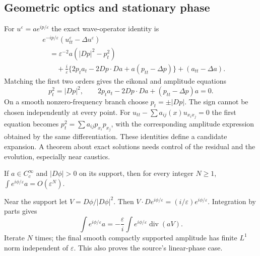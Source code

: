 \Needspace{35mm}
\subsection{Geometric optics and stationary phase}\label{sec:4-stationary}
For $u^\varepsilon=a e^{ip/\varepsilon}$ the exact wave-operator identity is
\[
 \begin{aligned}
 &e^{-ip/\varepsilon}(u^\varepsilon_{tt}-\Delta u^\varepsilon)\\
 &\quad=\varepsilon^{-2}a(|Dp|^2-p_t^2)\\
 &\qquad+\frac{i}{\varepsilon}
       \{2p_ta_t-2Dp\cdot Da+a(p_{tt}-\Delta p)\}
       +(a_{tt}-\Delta a).
 \end{aligned}
\]
Matching the first two orders gives the eikonal and amplitude equations
\[
 p_t^2=|Dp|^2,\qquad
 2p_ta_t-2Dp\cdot Da+(p_{tt}-\Delta p)a=0 .
\]
On a smooth nonzero-frequency branch choose $p_t=\pm|Dp|$.
The sign cannot be chosen independently at every point.
For $u_{tt}-\sum a_{ij}(x)u_{x_ix_j}=0$ the first equation becomes
$p_t^2=\sum a_{ij}p_{x_i}p_{x_j}$, with the corresponding amplitude
expression obtained by the same differentiation.
These identities define a candidate expansion.
A theorem about exact solutions needs control of the residual and
the evolution, especially near caustics.
\Needspace{45mm}

\begin{lemma}
If $a\in C_c^\infty$ and $|D\phi|>0$ on its support, then for every
integer $N\geq1$,
$\int e^{i\phi/\varepsilon}a=O(\varepsilon^N)$.
\end{lemma}
\begin{expandedproof}
Near the support let $V=D\phi/|D\phi|^2$.
Then $V\cdot D e^{i\phi/\varepsilon}=(i/\varepsilon)e^{i\phi/\varepsilon}$.
Integration by parts gives
\[
 \int e^{i\phi/\varepsilon}a
 =-\frac{\varepsilon}{i}\int e^{i\phi/\varepsilon}
                                  \operatorname{div}(aV).
\]
Iterate $N$ times; the final smooth compactly supported amplitude
has finite $L^1$ norm independent of $\varepsilon$.
This also proves the source's linear-phase case.
\end{expandedproof}

